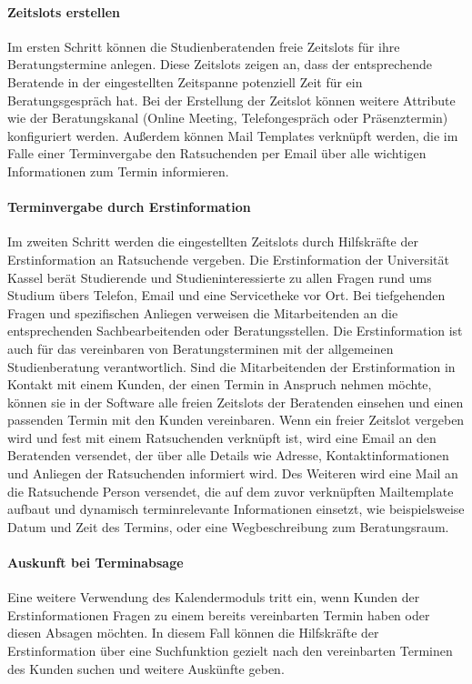 \paragraph{Zeitslots erstellen}
Im ersten Schritt können die Studienberatenden freie Zeitslots für ihre
Beratungstermine anlegen. Diese Zeitslots zeigen an, dass der entsprechende
Beratende in der eingestellten Zeitspanne potenziell Zeit für ein
Beratungsgespräch hat. Bei der Erstellung der Zeitslot können weitere Attribute
wie der Beratungskanal (Online Meeting, Telefongespräch oder Präsenztermin)
konfiguriert werden. Außerdem können Mail Templates verknüpft werden, die im
Falle einer Terminvergabe den Ratsuchenden per Email über alle wichtigen
Informationen zum Termin informieren.

\paragraph{Terminvergabe durch Erstinformation}
Im zweiten Schritt werden die eingestellten Zeitslots durch Hilfskräfte der
Erstinformation an Ratsuchende vergeben. Die Erstinformation der Universität
Kassel berät Studierende und Studieninteressierte zu allen Fragen rund ums
Studium übers Telefon, Email und eine Servicetheke vor Ort. Bei tiefgehenden
Fragen und spezifischen Anliegen verweisen die Mitarbeitenden an die
entsprechenden Sachbearbeitenden oder Beratungsstellen. Die Erstinformation ist
auch für das vereinbaren von Beratungsterminen mit der allgemeinen
Studienberatung verantwortlich. Sind die Mitarbeitenden der Erstinformation in
Kontakt mit einem Kunden, der einen Termin in Anspruch nehmen möchte, können
sie in der Software alle freien Zeitslots der Beratenden einsehen und einen
passenden Termin mit den Kunden vereinbaren. Wenn ein freier Zeitslot vergeben
wird und fest mit einem Ratsuchenden verknüpft ist, wird eine Email an den
Beratenden versendet, der über alle Details wie Adresse, Kontaktinformationen
und Anliegen der Ratsuchenden informiert wird. Des Weiteren wird eine Mail an
die Ratsuchende Person versendet, die auf dem zuvor verknüpften Mailtemplate
aufbaut und dynamisch terminrelevante Informationen einsetzt, wie
beispielsweise Datum und Zeit des Termins, oder eine Wegbeschreibung zum
Beratungsraum.

\paragraph{Auskunft bei Terminabsage}
Eine weitere Verwendung des Kalendermoduls tritt ein, wenn Kunden der
Erstinformationen Fragen zu einem bereits vereinbarten Termin haben oder diesen
Absagen möchten. In diesem Fall können die Hilfskräfte der Erstinformation über
eine Suchfunktion gezielt nach den vereinbarten Terminen des Kunden suchen und
weitere Auskünfte geben.

